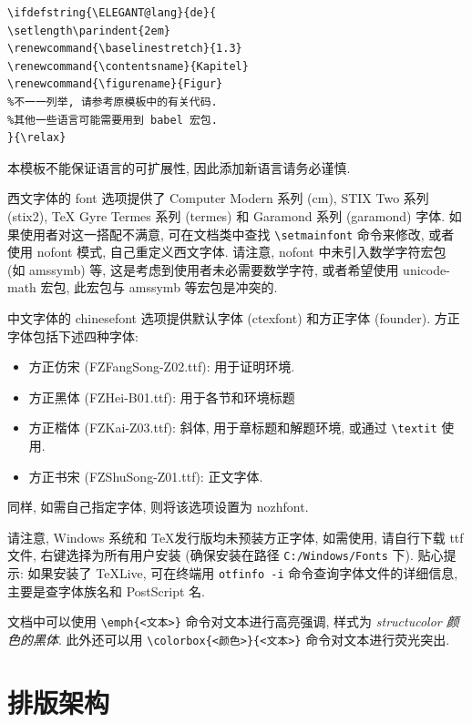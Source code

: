 \documentclass[../book.tex]{subfiles}
\begin{document}
\begin{lstlisting}
\ifdefstring{\ELEGANT@lang}{de}{
\setlength\parindent{2em}
\renewcommand{\baselinestretch}{1.3}
\renewcommand{\contentsname}{Kapitel}
\renewcommand{\figurename}{Figur}
%不一一列举, 请参考原模板中的有关代码.
%其他一些语言可能需要用到 babel 宏包.
}{\relax}
\end{lstlisting}

本模板不能保证语言的可扩展性, 因此添加新语言请务必谨慎.

西文字体的 font 选项提供了 Computer Modern 系列 (cm), STIX Two 系列 (stix2), TeX Gyre Termes 系列 (termes) 和 Garamond 系列 (garamond) 字体. 如果使用者对这一搭配不满意, 可在文档类中查找 \texttt{\textbackslash setmainfont} 命令来修改, 或者使用 nofont 模式, 自己重定义西文字体. 请注意, nofont 中未引入数学字符宏包 (如 amssymb) 等, 这是考虑到使用者未必需要数学字符, 或者希望使用 unicode-math 宏包, 此宏包与 amssymb 等宏包是冲突的. 

中文字体的 chinesefont 选项提供默认字体 (ctexfont) 和方正字体 (founder). 方正字体包括下述四种字体:
\begin{itemize}
    \item {\fangsong 方正仿宋} (FZFangSong-Z02.ttf): 用于证明环境.
    \item {\heiti 方正黑体} (FZHei-B01.ttf): 用于各节和环境标题
    \item {\kaishu 方正楷体} (FZKai-Z03.ttf): 斜体, 用于章标题和解题环境, 或通过 \texttt{\textbackslash textit} 使用.
    \item 方正书宋 (FZShuSong-Z01.ttf): 正文字体.
\end{itemize}

同样, 如需自己指定字体, 则将该选项设置为 nozhfont.

请注意, Windows 系统和 \TeX 发行版均未预装方正字体, 如需使用, 请自行下载 ttf 文件, 右键选择为所有用户安装 (确保安装在路径 \texttt{C:/Windows/Fonts} 下). \faHeart{}贴心提示: 如果安装了 TeXLive, 可在终端用 \texttt{otfinfo -i} 命令查询字体文件的详细信息, 主要是查字体族名和 PostScript 名. 

文档中可以使用 \texttt{\textbackslash emph\{<文本>\}} 命令对文本进行高亮强调, 样式为 \emph{structucolor 颜色的黑体}. 此外还可以用 \texttt{\textbackslash colorbox\{<颜色>\}\{<文本>\}} 命令对文本进行\colorbox{structurecolor!20}{荧光突出}.

\section{排版架构}
\end{document}
